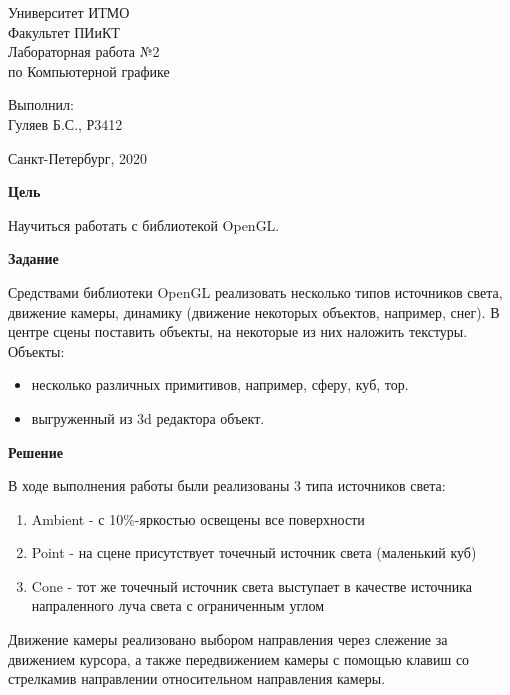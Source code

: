 \documentclass[a4paper,14pt]{extreport}
\begin{document}
\begin{center}
\hfill \break
Университет ИТМО\\ 
Факультет ПИиКТ\\
\vspace{3in}
\huge{Лабораторная работа №2}\\
{по Компьютерной графике}\\
\vspace{2.5in}
\end{center}
\begin{flushright}
Выполнил:\\
Гуляев Б.С., Р3412
\end{flushright}
\vfill
\begin{center}
Санкт-Петербург, 2020
\end{center}
\thispagestyle{empty}
\newpage
\par \textbf{Цель}

Научиться работать с библиотекой OpenGL.

\par \textbf{Задание}

Средствами библиотеки OpenGL реализовать несколько типов источников света, движение камеры, динамику (движение некоторых объектов, например, снег). В центре сцены поставить объекты, на некоторые из них наложить текстуры. Объекты:
\begin{itemize}
    \item несколько различных примитивов, например, сферу, куб, тор.
    \item выгруженный из 3d редактора объект.
\end{itemize}

\par \textbf{Решение}

В ходе выполнения работы были реализованы 3 типа источников света:
\begin{enumerate}
    \item Ambient - с 10\%-яркостью освещены все поверхности
    \item Point - на сцене присутствует точечный источник света (маленький куб)
    \item Cone - тот же точечный источник света выступает в качестве источника напраленного луча света с ограниченным углом
\end{enumerate}

Движение камеры реализовано выбором направления через слежение за движением курсора, а также передвижением камеры с помощью клавиш со стрелкамив направлении относительном направления камеры.
\end{document}

